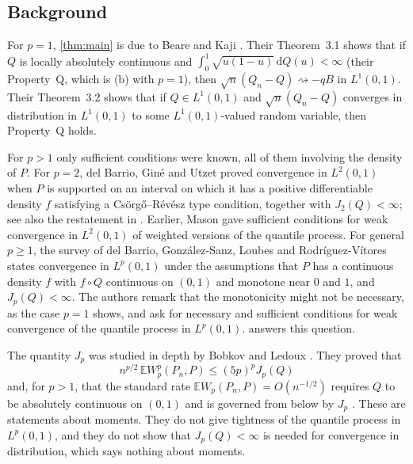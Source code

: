 \documentclass[11pt]{amsart}
\theoremstyle{remark}
\newcommand{\E}{\mathbb{E}}
\newcommand{\dd}{\,\mathrm{d}}
\newcommand{\Lp}{L^p(0,1)}
\newcommand{\weak}{\rightsquigarrow}
\begin{document}
\subsection*{Background}
For $p=1$, \cref{thm:main} is due to Beare and Kaji \cite{BeareKaji2025}. Their Theorem~3.1 shows that if $Q$ is locally absolutely continuous and $\int_0^1\sqrt{u(1-u)}\dd Q(u)<\infty$ (their Property~Q, which is (b) with $p=1$), then $\sqrt n(Q_n-Q)\weak -qB$ in $L^1(0,1)$. Their Theorem~3.2 shows that if $Q\in L^1(0,1)$ and $\sqrt n(Q_n-Q)$ converges in distribution in $L^1(0,1)$ to some $L^1(0,1)$-valued random variable, then Property~Q holds.

For $p>1$ only sufficient conditions were known, all of them involving the density of $P$. For $p=2$, del Barrio, Gin\'e and Utzet \cite{dBGU2005} proved convergence in $L^2(0,1)$ when $P$ is supported on an interval on which it has a positive differentiable density $f$ satisfying a Cs\"org\H{o}--R\'ev\'esz type condition, together with $J_2(Q)<\infty$; see also the restatement in \cite[Theorem~5.2]{BobkovLedoux2019}. Earlier, Mason \cite{Mason1984} gave sufficient conditions for weak convergence in $L^2(0,1)$ of weighted versions of the quantile process. For general $p\ge1$, the survey of del Barrio, Gonz\'alez-Sanz, Loubes and Rodr\'iguez-V\'itores \cite[Theorem~2.4]{dBGSLRV2025} states convergence in $\Lp$ under the assumptions that $P$ has a continuous density $f$ with $f\circ Q$ continuous on $(0,1)$ and monotone near $0$ and $1$, and $J_p(Q)<\infty$. The authors remark that the monotonicity might not be necessary, as the case $p=1$ shows, and ask \cite[Section~7, Problem~2]{dBGSLRV2025} for necessary and sufficient conditions for weak convergence of the quantile process in $\Lp$.  answers this question.

The quantity $J_p$ was studied in depth by Bobkov and Ledoux \cite{BobkovLedoux2019}. They proved that
\[
n^{p/2}\,\E W_p^p(P_n,P)\le(5p)^pJ_p(Q)
\]
\cite[Theorem~5.3]{BobkovLedoux2019} and, for $p>1$, that the standard rate $\E W_p(P_n,P)=O(n^{-1/2})$ requires $Q$ to be absolutely continuous on $(0,1)$ \cite[Theorem~5.6]{BobkovLedoux2019} and is governed from below by $J_p$ \cite[Theorem~5.9]{BobkovLedoux2019}. These are statements about moments. They do not give tightness of the quantile process in $\Lp$, and they do not show that $J_p(Q)<\infty$ is needed for convergence in distribution, which says nothing about moments.
\end{document}
